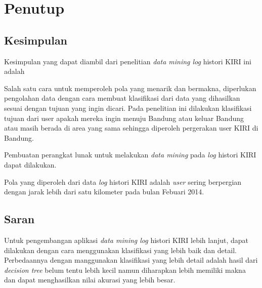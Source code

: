 \chapter{Penutup}

\section{Kesimpulan}

Kesimpulan yang dapat diambil dari penelitian \textsl{data mining log} histori KIRI ini adalah 

Salah satu cara untuk memperoleh pola yang menarik dan bermakna, diperlukan pengolahan data dengan cara membuat klasifikasi dari data yang dihasilkan sesuai dengan tujuan yang ingin dicari. Pada penelitian ini dilakukan klasifikasi tujuan dari user apakah mereka ingin menuju Bandung atau keluar Bandung atau masih berada di area yang sama sehingga diperoleh pergerakan user KIRI di Bandung.

Pembuatan perangkat lunak untuk melakukan \textsl{data mining} pada \textsl{log} histori KIRI dapat dilakukan.

Pola yang diperoleh dari data \textsl{log} histori KIRI adalah \textsl{user} sering berpergian dengan jarak lebih dari satu kilometer pada bulan Febuari 2014.

\section{Saran}

Untuk pengembangan aplikasi \textsl{data mining log} histori KIRI lebih lanjut, dapat dilakukan dengan cara menggunakan klasifikasi yang lebih baik dan detail. Perbedaannya dengan manggunakan klasifikasi yang lebih detail adalah hasil dari \textsl{decision tree} belum tentu lebih kecil namun diharapkan lebih memiliki makna dan dapat menghasilkan nilai akurasi yang lebih besar.